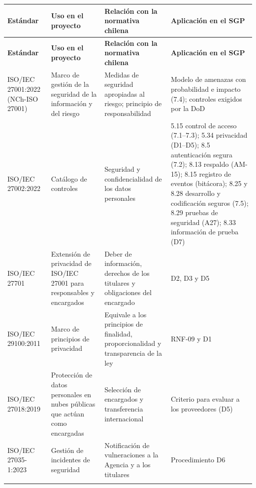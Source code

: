 \documentclass[11pt,a4paper]{article}
\begin{document}
\begingroup\small
\begin{longtable}{@{}>{\raggedright\arraybackslash\hspace{0pt}}p{}>{\raggedright\arraybackslash\hspace{0pt}}p{}>{\raggedright\arraybackslash\hspace{0pt}}p{}>{\raggedright\arraybackslash\hspace{0pt}}p{}@{}}
\toprule
\textbf{Estándar} & \textbf{Uso en el proyecto} & \textbf{Relación con la normativa chilena} & \textbf{Aplicación en el SGP} \\ \midrule
\endfirsthead
\toprule
\textbf{Estándar} & \textbf{Uso en el proyecto} & \textbf{Relación con la normativa chilena} & \textbf{Aplicación en el SGP} \\ \midrule
\endhead
\bottomrule
\endlastfoot
ISO/IEC 27001:2022 (NCh-ISO 27001) & Marco de gestión de la seguridad de la información y del riesgo & Medidas de seguridad apropiadas al riesgo; principio de responsabilidad & Modelo de amenazas con probabilidad e impacto (7.4); controles exigidos por la DoD \\ \addlinespace[0.25em]
ISO/IEC 27002:2022 & Catálogo de controles & Seguridad y confidencialidad de los datos personales & 5.15 control de acceso (7.1--7.3); 5.34 privacidad (D1--D5); 8.5 autenticación segura (7.2); 8.13 respaldo (\mbox{AM-15}); 8.15 registro de eventos (bitácora); 8.25 y 8.28 desarrollo y codificación seguros (7.5); 8.29 pruebas de seguridad (A27); 8.33 información de prueba (D7) \\ \addlinespace[0.25em]
ISO/IEC 27701 & Extensión de privacidad de ISO/IEC 27001 para responsables y encargados & Deber de información, derechos de los titulares y obligaciones del encargado & D2, D3 y D5 \\ \addlinespace[0.25em]
ISO/IEC 29100:2011 & Marco de principios de privacidad & Equivale a los principios de finalidad, proporcionalidad y transparencia de la ley & \mbox{RNF-09} y D1 \\ \addlinespace[0.25em]
ISO/IEC 27018:2019 & Protección de datos personales en nubes públicas que actúan como encargadas & Selección de encargados y transferencia internacional & Criterio para evaluar a los proveedores (D5) \\ \addlinespace[0.25em]
ISO/IEC 27035-1:2023 & Gestión de incidentes de seguridad & Notificación de vulneraciones a la Agencia y a los titulares & Procedimiento D6 \\ \addlinespace[0.25em]

\end{longtable}
\end{document}
